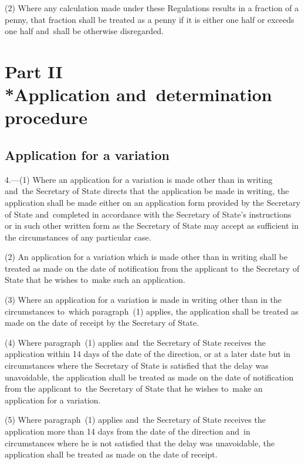 \documentclass[12pt,a4paper]{article}
\begin{document}
(2) Where any calculation made under these Regulations results in a fraction of a penny, that fraction shall be treated as a penny if it is either one half or exceeds one half and~shall be otherwise disregarded.

\section[Part II --- Application and~determination procedure]{Part II\\*Application and~determination procedure}

\renewcommand\parthead{--- Part II}

\subsection[4. Application for a variation]{Application for a variation}

4.---(1)  Where an application for a variation is made other than in writing and~the Secretary of State directs that the application be made in writing, the application shall be made either on an application form provided by the Secretary of State and~completed in accordance with the Secretary of State’s instructions or in such other written form as the Secretary of State may accept as sufficient in the circumstances of any particular case.

(2) An application for a variation which is made other than in writing shall be treated as made on the date of notification from the applicant to~the Secretary of State that he wishes to~make such an application.

(3) Where an application for a variation is made in writing other than in the circumstances to~which paragraph~(1) applies, the application shall be treated as made on the date of receipt by the Secretary of State.

(4) Where paragraph~(1) applies and~the Secretary of State receives the application within 14 days of the date of the direction, or at a later date but in circumstances where the Secretary of State is satisfied that the delay was unavoidable, the application shall be treated as made on the date of notification from the applicant to~the Secretary of State that he wishes to~make an application for a variation.

(5) Where paragraph~(1) applies and~the Secretary of State receives the application more than 14 days from the date of the direction and~in circumstances where he is not satisfied that the delay was unavoidable, the application shall be treated as made on the date of receipt.
\end{document}
